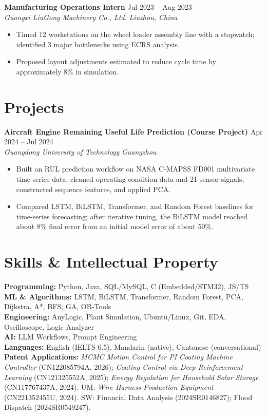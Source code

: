 \documentclass[10pt,a4paper]{article}
\newcommand{\resumeItem}[1]{\item #1}
\newcommand{\experienceEntry}[4]{%
  \textbf{#1} \hfill #2 \\
  \textit{#3} \hfill \textit{#4}
}
\begin{document}
\vspace{2pt}

\experienceEntry{Manufacturing Operations Intern}{Jul 2023 -- Aug 2023}{Guangxi LiuGong Machinery Co., Ltd.}{Liuzhou, China}
\begin{itemize}
  \resumeItem{Timed 12 workstations on the wheel loader assembly line with a stopwatch; identified 3 major bottlenecks using ECRS analysis.}
  \resumeItem{Proposed layout adjustments estimated to reduce cycle time by approximately 8\% in simulation.}
\end{itemize}

\section{Projects}

\experienceEntry{Aircraft Engine Remaining Useful Life Prediction (Course Project)}{Apr 2024 -- Jul 2024}{Guangdong University of Technology}{Guangzhou}
\begin{itemize}
  \resumeItem{Built an RUL prediction workflow on NASA C-MAPSS FD001 multivariate time-series data; cleaned operating-condition data and 21 sensor signals, constructed sequence features, and applied PCA.}
  \resumeItem{Compared LSTM, BiLSTM, Transformer, and Random Forest baselines for time-series forecasting; after iterative tuning, the BiLSTM model reached about 8\% final error from an initial model error of about 50\%.}
\end{itemize}

\section{Skills \& Intellectual Property}

\textbf{Programming:} Python, Java, SQL/MySQL, C (Embedded/STM32), JS/TS \\
\textbf{ML \& Algorithms:} LSTM, BiLSTM, Transformer, Random Forest, PCA, Dijkstra, A*, BFS, GA, OR-Tools \\
\textbf{Engineering:} AnyLogic, Plant Simulation, Ubuntu/Linux, Git, EDA, Oscilloscope, Logic Analyzer \\
\textbf{AI:} LLM Workflows, Prompt Engineering \\
\textbf{Languages:} English (IELTS 6.5), Mandarin (native), Cantonese (conversational)\\
\textbf{Patent Applications:}
\textit{MCMC Motion Control for PI Coating Machine Controller} (CN122085794A, 2026);
\textit{Coating Control via Deep Reinforcement Learning} (CN121325552A, 2025);
\textit{Energy Regulation for Household Solar Storage} (CN117767437A, 2024). UM: \textit{Wire Harness Production Equipment} (CN221352455U, 2024). SW: Financial Data Analysis (2024SR0146827); Flood Dispatch (2024SR0549247).
\end{document}
